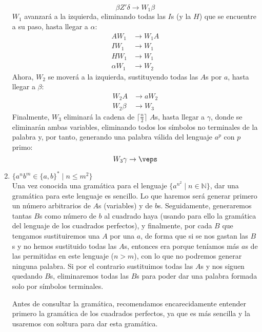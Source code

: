 \begin{ejercicio}
\begin{enumerate}
\begin{equation*}
            \beta Z' \delta \rightarrow W_1 \beta
        \end{equation*}
        $W_1$ avanzará a la izquierda, eliminando todas las $I$s (y la $H$) que se encuentre a su paso, hasta llegar a $\alpha$:
        \begin{align*}
            AW_1 &\rightarrow W_1A \\
            IW_1 &\rightarrow W_1 \\
            HW_1 &\rightarrow W_1 \\
            \alpha W_1 &\rightarrow W_2
        \end{align*}
        Ahora, $W_2$ se moverá a la izquierda, sustituyendo todas las $A$s por $a$, hasta llegar a $\beta$:
        \begin{align*}
            W_2A &\rightarrow aW_2 \\
            W_2\beta &\rightarrow W_3
        \end{align*}
        Finalmente, $W_3$ eliminará la cadena de $\lceil \frac{n}{2}\rceil$ $A$s, hasta llegar a $\gamma$, donde se eliminarán ambas variables, eliminando todos los símbolos no terminales de la palabra y, por tanto, generando una palabra válida del lenguaje $a^p$ con $p$ primo:
        \begin{equation*}
            W_3 \gamma \rightarrow \veps
        \end{equation*}
    
        \item $\{a^nb^m \in \{a,b\}^{\ast} \mid n\leq m^2\}$\\

            Una vez conocida una gramática para el lenguaje $\{a^{n^2} \mid n \in \mathbb{N}\}$, dar una gramática para este lenguaje es sencillo. Lo que haremos será generar primero un número arbitrarios de $A$s (variables) y de $b$s. Seguidamente, generaremos tantas $B$s como número de $b$ al cuadrado haya (usando para ello la gramática del lenguaje de los cuadrados perfectos), y finalmente, por cada $B$ que tengamos sustituiremos una $A$ por una $a$, de forma que si se nos gastan las $B$s y no hemos sustituido todas las $A$s, entonces era porque teníamos más $a$s de las permitidas en este lenguaje ($n>m$), con lo que no podremos generar ninguna palabra. Si por el contrario sustituimos todas las $A$s y nos siguen quedando $B$s, eliminaremos todas las $B$s para poder dar una palabra formada solo por símbolos terminales.

            Antes de consultar la gramática, recomendamos encarecidamente entender primero la gramática de los cuadrados perfectos, ya que es más sencilla y la usaremos con soltura para dar esta gramática.


\end{enumerate}
\end{ejercicio}
